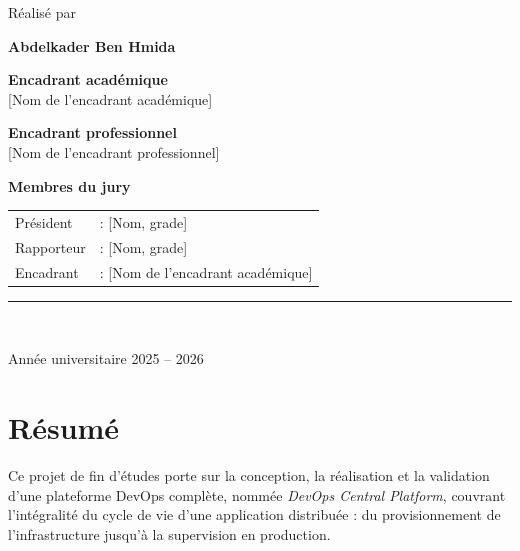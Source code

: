 \documentclass[12pt,a4paper,oneside]{report}
\makeatletter
\def\cleardoublepage{\clearpage\if@twoside
  \ifodd\c@page\else\hbox{}\thispagestyle{empty}\newpage\fi\fi}
\newcommand{\anneeuniv}{Année universitaire 2025 -- 2026}
\newcommand{\auteur}{Abdelkader Ben Hmida}
\newcommand{\encadrantacad}{[Nom de l'encadrant académique]}
\newcommand{\encadrantpro}{[Nom de l'encadrant professionnel]}
\makeatother
\begin{document}
\begin{titlepage}
\vspace{1.0cm}
{\sffamily\large Réalisé par\par}
\vspace{0.15cm}
{\sffamily\LARGE\bfseries \auteur\par}

\vfill

\begin{minipage}[t]{0.48\textwidth}
  \raggedright\sffamily\small
  \textbf{Encadrant académique}\\[2pt] \encadrantacad
\end{minipage}\hfill
\begin{minipage}[t]{0.48\textwidth}
  \raggedleft\sffamily\small
  \textbf{Encadrant professionnel}\\[2pt] \encadrantpro
\end{minipage}

\vspace{0.7cm}
{\sffamily\small\textbf{Membres du jury}\par}
\vspace{3pt}
{\sffamily\small
\begin{tabular}{@{}ll@{}}
Président & : [Nom, grade] \\
Rapporteur & : [Nom, grade] \\
Encadrant & : \encadrantacad \\
\end{tabular}\par}

\vspace{0.7cm}
{\color{pfeaccent}\rule{\textwidth}{1.2pt}}\\[0.25cm]
{\sffamily\normalsize \anneeuniv\par}
\end{titlepage}

\cleardoublepage
{}

\chapter*{Résumé}

Ce projet de fin d'études porte sur la conception, la réalisation et la validation
d'une plateforme DevOps complète, nommée \emph{DevOps Central Platform}, couvrant
l'intégralité du cycle de vie d'une application distribuée : du provisionnement de
l'infrastructure jusqu'à la supervision en production.
\end{document}
